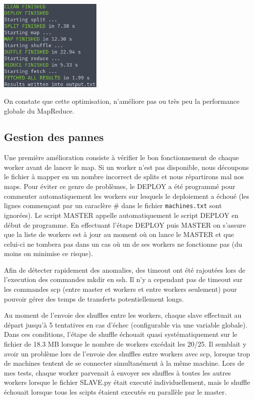 \documentclass[11pt,a4paper]{article}
\begin{document}
\includegraphics[width=5cm]{screenshot9.png}

On constate que cette optimisation, n'améliore pas ou très peu la performance globale du MapReduce.

\subsection*{Gestion des pannes}
Une première amélioration consiste à vérifier le bon fonctionnement de chaque worker avant de lancer le map. Si un worker n'est pas disponible, nous découpons le fichier à mapper en un nombre incorrect de splits et nous répartirons mal nos maps. Pour éviter ce genre de problèmes, le DEPLOY a été programmé pour commenter automatiquement les workers sur lesquels le deploiement a échoué (les lignes commençant par un caraclère \# dans le fichier \texttt{machines.txt} sont ignorées). Le script MASTER appelle automatiquement le script DEPLOY en début de programme. En effectuant l'étape DEPLOY puis MASTER on s'assure que la liste de workers est à jour au moment où on lance le MASTER et que celui-ci ne tombera pas dans un cas où un de ses workers ne fonctionne pas (du moins on minimise ce risque).

Afin de détecter rapidement des anomalies, des timeout ont été rajoutées lors de l'execution des commandes mkdir en ssh. Il n'y a cependant pas de timeout sur les commandes scp (entre master et workers et entre workers seulement) pour pouvoir gérer des temps de transferts potentiellement longs.

Au moment de l'envoie des shuffles entre les workers, chaque slave effectuait au départ jusqu'à 5 tentatives en cas d'échec (configurable via une variable globale). Dans ces conditions, l'étape de shuffle échouait quasi systématiquement sur le fichier de 18.3 MB lorsque le nombre de workers excédait les 20/25. Il semblait y avoir un problème lors de l'envoie des shuffles entre workers avec scp, lorsque trop de machines tentent de se connecter simultanément à la même machine. Lors de mes tests, chaque worker parvenait à envoyer ses shuffles à toutes les autres workers lorsque le fichier SLAVE.py était executé individuellement, mais le shuffle échouait lorsque tous les scipts étaient executés en parallèle par le master.
\end{document}
